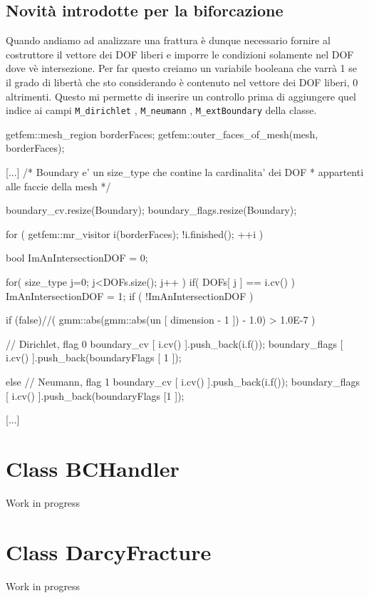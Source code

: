 \subsection{Novit\`{a} introdotte per la biforcazione}
Quando andiamo ad analizzare una frattura è dunque necessario fornire al costruttore il vettore dei DOF liberi e imporre le condizioni solamente nel DOF dove v\`{e} intersezione. Per far questo creiamo un variabile booleana che varr\`{a} 1 se il grado di libert\`{a} che sto considerando è contenuto nel vettore dei DOF liberi, 0 altrimenti. Questo mi permette di inserire un controllo prima di aggiungere quel indice ai campi \texttt{M\_dirichlet} , \texttt{M\_neumann} , \texttt{M\_extBoundary} della classe.
\begin{Code}[caption={Classe \texttt{BC}}]
[...]

getfem::mesh_region borderFaces;
getfem::outer_faces_of_mesh(mesh, borderFaces);

[...]
/* Boundary e' un size_type che contine la cardinalita' dei DOF 
 * appartenti alle faccie della mesh */
 
boundary_cv.resize(Boundary);
boundary_flags.resize(Boundary);

for ( getfem::mr_visitor i(borderFaces); !i.finished(); ++i )
{
	bool ImAnIntersectionDOF = 0;
				
	for( size_type j=0; j<DOFs.size(); j++ )
	{
		if( DOFs[ j ] == i.cv() )
		{
			ImAnIntersectionDOF = 1;
		}
	}
	if ( !ImAnIntersectionDOF )
	{
	  if (false)//( gmm::abs(gmm::abs(un [ dimension - 1 ]) - 1.0) > 1.0E-7 )  
	  {				
		// Dirichlet, flag 0
		boundary_cv [ i.cv() ].push_back(i.f());
		boundary_flags [ i.cv() ].push_back(boundaryFlags [ 1 ]);
		
	  }
	  else
	  {
		// Neumann, flag 1
		boundary_cv [ i.cv() ].push_back(i.f());
		boundary_flags [ i.cv() ].push_back(boundaryFlags [1 ]);
	  }
	}
}

[...]
\end{Code}



\section{Class BCHandler}

Work in progress

\section{Class DarcyFracture}

Work in progress

